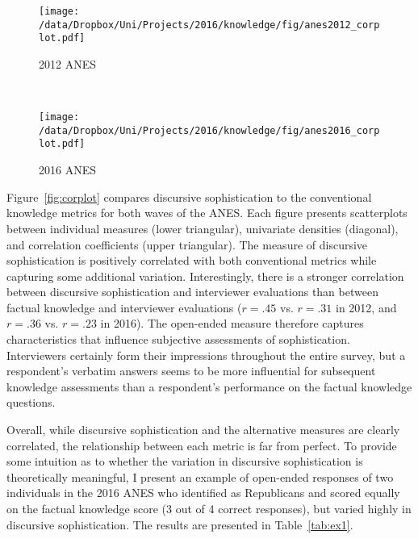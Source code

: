 \begin{figure*}[h]
    \centering
    \begin{subfigure}[t]{0.5\textwidth}
        \centering
        \texttt{[image: /data/Dropbox/Uni/Projects/2016/knowledge/fig/anes2012\_corplot.pdf]}
        \caption{2012 ANES}
    \end{subfigure}%
    ~ 
    \begin{subfigure}[t]{0.5\textwidth}
        \centering
        \texttt{[image: /data/Dropbox/Uni/Projects/2016/knowledge/fig/anes2016\_corplot.pdf]}
        \caption{2016 ANES}
    \end{subfigure}
    \caption[Correlation matrix of discursive sophistication and conventional political knowledge metrics]{Correlation matrix of discursive sophistication and conventional political knowledge metrics. The plots on the diagonal display univariate densities for each variable. The panels in the lower triangular display the scatter plot of two measures as well as a linear fit. The upper triangular displays the correlation coefficient. All correlations reported are statistically significant with $p<.05$.}\label{fig:corplot}
\end{figure*}

Figure~\ref{fig:corplot} compares discursive sophistication to the conventional knowledge metrics for both waves of the ANES. Each figure presents scatterplots between individual measures (lower triangular), univariate densities (diagonal), and correlation coefficients (upper triangular). The measure of discursive sophistication is positively correlated with both conventional metrics while capturing some additional variation. Interestingly, there is a stronger correlation between discursive sophistication and interviewer evaluations than between factual knowledge and interviewer evaluations ($r=.45$ vs. $r=.31$ in 2012, and $r=.36$ vs. $r=.23$ in 2016). The open-ended measure therefore captures characteristics that influence subjective assessments of sophistication. Interviewers certainly form their impressions throughout the entire survey, but a respondent's verbatim answers seems to be more influential for subsequent knowledge assessments than a respondent's performance on the factual knowledge questions.

Overall, while discursive sophistication and the alternative measures are clearly correlated, the relationship between each metric is far from perfect. To provide some intuition as to whether the variation in discursive sophistication is theoretically meaningful, I present an example of open-ended responses of two individuals in the 2016 ANES who identified as Republicans and scored equally on the factual knowledge score (3 out of 4 correct responses), but varied highly in discursive sophistication. The results are presented in Table~\ref{tab:ex1}.

